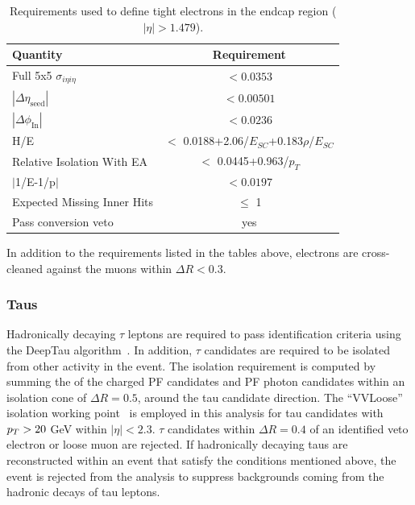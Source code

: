 \begin{table}[htbp]
\centering
\def\arraystretch{1.2}
\begin{tabular}{|l|c|}
    \hline\hline
    Quantity & Requirement \\\hline
    Full 5x5 $\sigma_{i\eta i\eta}$ &  $< 0.0353$ \\
    $|\Delta\eta_{\mathrm{seed}}|$ & $< 0.00501$  \\
    $|\Delta\phi_{\mathrm{In}}|$ & $< 0.0236$ \\
    H/E & $<$ 0.0188+2.06/$E_{SC}$+0.183$\rho$/$E_{SC}$ \\
    Relative Isolation With EA & $<$ 0.0445+0.963/$p_T$ \\
    $|$1/E-1/p$|$ & $< 0.0197$ \\
    Expected Missing Inner Hits & $\leq$ 1 \\
    Pass conversion veto & yes \\
    \hline\hline
\end{tabular}
\caption{Requirements used to define tight electrons in the endcap region ($|\eta| > 1.479$).}
\label{tab:tight_electron_def_endcap}
\end{table}

In addition to the requirements listed in the tables above, electrons are cross-cleaned against the muons
within $\Delta R < 0.3$.

\subsubsection{Taus}

Hadronically decaying $\tau$ leptons are required to pass identification criteria
using the DeepTau algorithm~\cite{CMS-DP-2019-033}. In addition, $\tau$ candidates are required to be isolated from other activity in the
event. The isolation requirement is computed by summing the \pt of the charged PF
candidates and PF photon candidates within an isolation cone of $\Delta R = 0.5$,
around the tau candidate direction. 
The ``VVLoose'' isolation working point~\cite{taupog_twiki} is employed in this analysis
for tau candidates with $p_T > 20$ GeV within $|\eta| < 2.3$. $\tau$ candidates within $\Delta R = 0.4$ of 
an identified veto electron or loose muon are rejected. If hadronically decaying taus are reconstructed within
an event that satisfy the conditions mentioned above, the event is rejected from the analysis to suppress 
backgrounds coming from the hadronic decays of tau leptons. 

